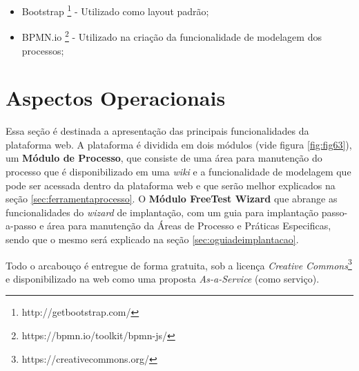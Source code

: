 \begin{itemize}
    \item Bootstrap \footnote{http://getbootstrap.com/} - Utilizado como layout padrão;
    \item BPMN.io \footnote{https://bpmn.io/toolkit/bpmn-js/} - Utilizado na criação da funcionalidade de modelagem dos processos;
\end{itemize}

\section{Aspectos Operacionais}
\label{sec:aspectosoperacionais}

Essa seção é destinada a apresentação das principais funcionalidades da plataforma web. A plataforma é dividida em dois módulos (vide figura \ref{fig:fig63}), um \textbf{Módulo de Processo}, que consiste de uma área para manutenção do processo que é disponibilizado em uma \textit{wiki} e a funcionalidade de modelagem que pode ser acessada dentro da plataforma web e que serão melhor explicados na seção \ref{sec:ferramentaprocesso}. O \textbf{Módulo FreeTest Wizard} que abrange as funcionalidades do \textit{wizard} de implantação, com um guia para implantação passo-a-passo e área para manutenção da Áreas de Processo e Práticas Especificas, sendo que o mesmo será explicado na seção \ref{sec:oguiadeimplantacao}.

Todo o arcabouço é entregue de forma gratuita, sob a licença \textit{Creative Commons}\footnote{https://creativecommons.org/} e disponibilizado na web como uma proposta \textit{As-a-Service} (como serviço). 




